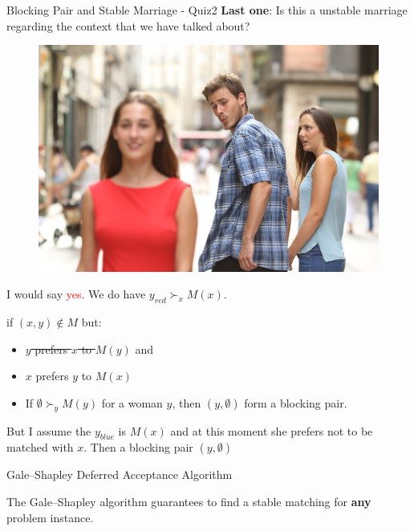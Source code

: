 \documentclass{beamer}
\begin{document}
{
\begin{frame}{Blocking Pair and Stable Marriage - Quiz2}
	\textbf{Last one}: Is this a unstable marriage regarding the context that we have talked about?
\begin{center}
	\begin{figure}
		\includegraphics[width=.3\textwidth]{distracted_boyfriend.jpg}
	\end{figure}
	\pause
	I would say \textcolor{red}{yes}. We do have $y_{red} \succ_{x} M(x)$. \\
	\vfill
	\begin{description}[leftmargin=!,labelwidth=\widthof{\bfseries Blocking Pair}]
		\item [\emph{Blocking Pair}] if $(x, y) \notin M$ but:
	\end{description}
	\begin{itemize}[leftmargin=1em+2.5cm]
			\item \st{$y$ prefers $x$ to $M(y)$} and
			\item $x$ prefers $y$ to $M(x)$
			\item If $\emptyset \succ_y M(y)$ for a woman $y$, then $(y, \emptyset)$ form a blocking pair.
	\end{itemize}
	But I assume the $y_{blue}$ is $M(x)$ and at this moment she prefers not to be matched with $x$. Then a blocking pair $(y, \emptyset)$
\end{center}
\end{frame}
}


\begin{frame}{Gale–Shapley Deferred Acceptance Algorithm}
	\begin{theorem}
		 The Gale–Shapley algorithm guarantees to find a stable matching for \textbf{any} problem instance.
	\end{theorem} 
	\begin{center}
		\begin{figure}
		\end{figure}
	\end{center}
\end{frame}
\end{document}
